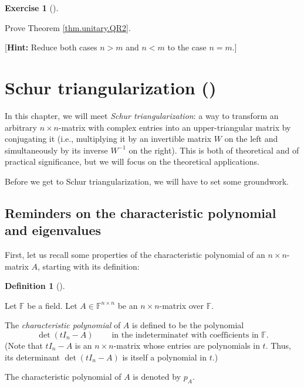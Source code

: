 \documentclass[numbers=enddot,12pt,final,onecolumn,notitlepage]{scrartcl}%
\newcounter{exer}
\numberwithin{exer}{subsection}
\theoremstyle{definition}
\newtheorem{defi}[theo]{Definition}
\newenvironment{definition}[1][]
{\begin{defi}[#1]\begin{leftbar}}
{\end{leftbar}\end{defi}}
\newtheorem{exmp}[exer]{Exercise}
\newenvironment{exercise}[1][]
{\begin{exmp}[#1]\begin{leftbar}}
{\end{leftbar}\end{exmp}}
\begin{document}
\begin{exercise}
\label{exe.unitary.QR2} Prove Theorem \ref{thm.unitary.QR2}.

[\textbf{Hint:} Reduce both cases $n>m$ and $n<m$ to the case $n=m$.]
\end{exercise}

\section{Schur triangularization (\cite[Chapter 2]{HorJoh13})}

In this chapter, we will meet \emph{Schur triangularization}: a way to
transform an arbitrary $n\times n$-matrix with complex entries into an
upper-triangular matrix by conjugating it (i.e., multiplying it by an
invertible matrix $W$ on the left and simultaneously by its inverse $W^{-1}$
on the right). This is both of theoretical and of practical significance, but
we will focus on the theoretical applications.

Before we get to Schur triangularization, we will have to set some groundwork.\setcounter{subsection}{-1}

\subsection{Reminders on the characteristic polynomial and eigenvalues}

First, let us recall some properties of the characteristic polynomial of an
$n\times n$-matrix $A$, starting with its definition:

\begin{definition}
\label{def.schurtri.ch.pA}Let $\mathbb{F}$ be a field. Let $A\in
\mathbb{F}^{n\times n}$ be an $n\times n$-matrix over $\mathbb{F}$.

The \emph{characteristic polynomial} of $A$ is defined to be the polynomial%
\[
\det\left(  tI_{n}-A\right)  \ \ \ \ \ \ \ \ \ \ \text{in the indeterminate
}t\text{ with coefficients in }\mathbb{F}.
\]
(Note that $tI_{n}-A$ is an $n\times n$-matrix whose entries are polynomials
in $t$. Thus, its determinant $\det\left(  tI_{n}-A\right)  $ is itself a
polynomial in $t$.)

The characteristic polynomial of $A$ is denoted by $p_{A}$.
\end{definition}
\end{document}

